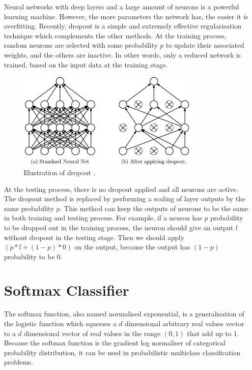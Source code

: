 Neural networks with deep layers and a large amount of neurons is a powerful learning machine. However, the more parameters the network has, the easier it is overfitting. Recently, dropout \citep{srivastava2014dropout} is a simple and extremely effective regularisation technique which complements the other methods. At the training process, random neurons are selected with some probability $p$ to update their associated weights, and the others are inactive. In other words, only a reduced network is trained, based on the input data at the training stage. 
\graphicspath{ {./Figures/} }
\begin{figure}[!htb]
\centering
\includegraphics[width=0.8\textwidth]{dropout.jpeg}
\caption{\label{fig:Dropout}Illustration of dropout \citep{srivastava2014dropout}.}
\end{figure}
At the testing process, there is no dropout applied and all neurons are active. The dropout method is replaced by performing a scaling of layer outputs by the same probability $p$. This method can keep the outputs of neurons to be the same in both training and testing process. For example, if a neuron has $p$ probability to be dropped out in the training process, the neuron should give an output $l$ without dropout in the testing stage. Then we should apply $(p\ast l + (1 - p)\ast 0)$ on the output, because the output has $(1-p)$ probability to be $0$.

\section{Softmax Classifier}

The softmax function, also named normalised exponential, is a generalisation of the logistic function which squeezes a $d$ dimensional arbitrary real values vector to a $d$ dimensional vector of real values in the range $(0,1)$ that add up to 1. Because the softmax function is the gradient log normaliser of categorical probability distribution, it can be used in probabilistic multiclass classification problems.

